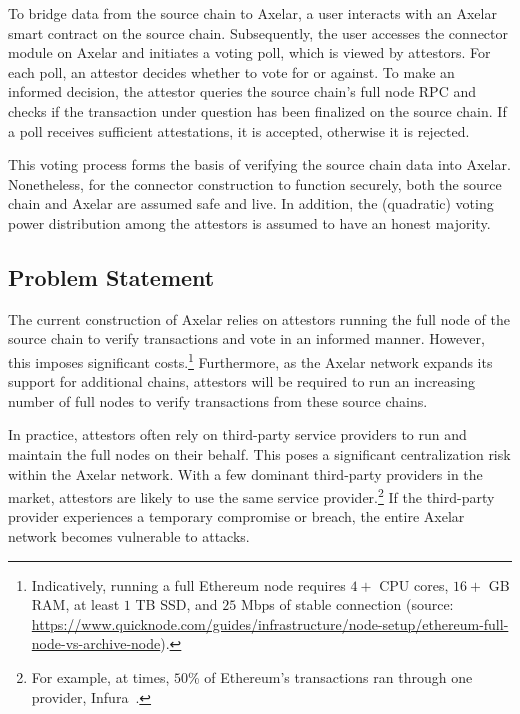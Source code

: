 To bridge data from the source chain to Axelar, a user interacts with an Axelar smart contract on the source chain. Subsequently, the user accesses the connector module on Axelar and initiates a voting poll, which is viewed by attestors. For each poll, an attestor decides whether to vote for or against. To make an informed decision, the attestor queries the source chain's full node RPC and checks if the
transaction under question has been finalized on the source chain. If a poll receives sufficient attestations, it is accepted, otherwise it is rejected.

This voting process forms the basis of verifying the source chain data into Axelar.
Nonetheless, for the connector construction to function securely, both the source chain and Axelar are assumed safe and live. In addition, the (quadratic) voting power distribution among the attestors is assumed to have an honest majority.

\subsection{Problem Statement}
The current construction of Axelar relies on attestors running the full node of the source chain to verify transactions and vote in an informed manner. However, this imposes significant costs.\footnote{Indicatively, running a full Ethereum node requires $4+$ CPU cores, $16+$ GB RAM, at least $1$ TB SSD, and $25$ Mbps of stable connection (source: \url{https://www.quicknode.com/guides/infrastructure/node-setup/ethereum-full-node-vs-archive-node}).}
Furthermore, as the Axelar network expands its support for additional chains, attestors will be required to run an increasing number of full nodes to verify transactions from these source chains.

In practice, attestors often rely on third-party service providers to run and maintain the full nodes on their behalf. 
% 
This poses a significant centralization risk within the Axelar network. With a few dominant third-party providers in the market, attestors are likely to use the same service provider.\footnote{For example, at times, $50$\% of Ethereum's transactions ran through one provider, Infura~\cite{infura}.} If the third-party provider experiences a temporary compromise or breach, the entire Axelar network becomes vulnerable to attacks. 

